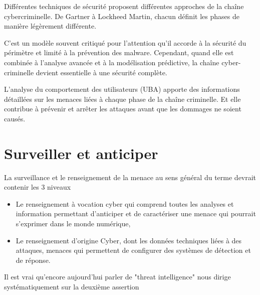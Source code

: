 Différentes techniques de sécurité proposent différentes approches de la chaîne cybercriminelle. De Gartner à Lockheed Martin, chacun définit les phases de manière légèrement différente.

C’est un modèle souvent critiqué pour l’attention qu’il accorde à la sécurité du périmètre et limité à la prévention des malware. Cependant, quand elle est combinée à l’analyse avancée et à la modélisation prédictive, la chaîne cyber-criminelle devient essentielle à une sécurité complète.

L’analyse du comportement des utilisateurs (UBA) apporte des informations détaillées sur les menaces liées à chaque phase de la chaîne criminelle. Et elle contribue à prévenir et arrêter les attaques avant que les dommages ne soient causés.



\section{Surveiller et anticiper}

La surveillance et le renseignement de la menace au sens général du terme devrait contenir les 3 niveaux

\begin{itemize}
  \item Le renseignement à vocation cyber qui comprend toutes les analyses et information permettant d'anticiper et de caractériser une menace qui pourrait s'exprimer dans le monde numérique,
  \item Le renseignement d'origine Cyber, dont les données techniques liées à des attaques, menaces qui permettent de configurer des systèmes de détection et de réponse.

\end{itemize}

Il est vrai qu'encore aujourd'hui parler de "threat intelligence"  nous dirige systématiquement sur la deuxième assertion


